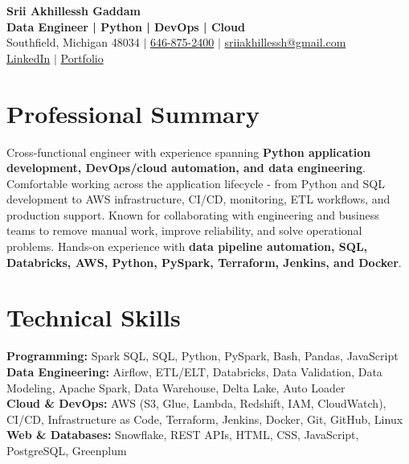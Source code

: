 \documentclass[letterpaper,10pt]{article}
\begin{document}
\fontsize{9.35pt}{10.45pt}\selectfont

\begin{center}
    {\LARGE \textbf{Srii Akhillessh Gaddam}} \\[-1pt]
    \textbf{Data Engineer | Python | DevOps | Cloud} \\[2pt]
    Southfield, Michigan 48034 $|$
    \href{tel:6468752400}{646-875-2400} $|$
    \href{mailto:sriiakhillessh@gmail.com}{sriiakhillessh@gmail.com} \\[1pt]
    \href{https://www.linkedin.com/in/srii-akhiilessh-gaddam-b48668191/}{LinkedIn} $|$
    \href{https://sriiakhillesshg.github.io/portfolio/}{Portfolio}
\end{center}
\vspace{-8pt}

\section{Professional Summary}
\small{Cross-functional engineer with experience spanning \textbf{Python application development, DevOps/cloud automation, and data engineering}. Comfortable working across the application lifecycle - from Python and SQL development to AWS infrastructure, CI/CD, monitoring, ETL workflows, and production support. Known for collaborating with engineering and business teams to remove manual work, improve reliability, and solve operational problems. Hands-on experience with \textbf{data pipeline automation, SQL, Databricks, AWS, Python, PySpark, Terraform, Jenkins, and Docker}.}

\section{Technical Skills}
\small{
\textbf{Programming:} Spark SQL, SQL, Python, PySpark, Bash, Pandas, JavaScript \\
\textbf{Data Engineering:} Airflow, ETL/ELT, Databricks, Data Validation, Data Modeling, Apache Spark, Data Warehouse, Delta Lake, Auto Loader \\
\textbf{Cloud \& DevOps:} AWS (S3, Glue, Lambda, Redshift, IAM, CloudWatch), CI/CD, Infrastructure as Code, Terraform, Jenkins, Docker, Git, GitHub, Linux \\
\textbf{Web \& Databases:} Snowflake, REST APIs, HTML, CSS, JavaScript, PostgreSQL, Greenplum
}
\end{document}
